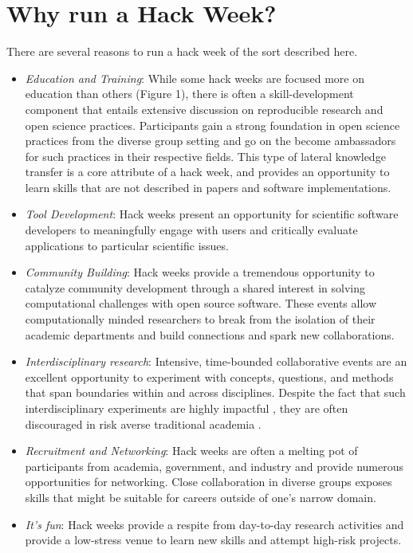 \section*{Why run a Hack Week?}

There are several reasons to run a hack week of the sort described here.

\begin{itemize}
\item{\textit{Education and Training}: 
While some hack weeks are focused more on education than others (Figure 1), there is often a skill-development component that entails extensive discussion on reproducible research and open science practices. Participants gain a strong foundation in open science practices from the diverse group setting and go on the become ambassadors for such practices in their respective fields. This type of lateral knowledge transfer is a core attribute of a hack week, and provides an opportunity to learn skills that are not described in papers and software implementations.}

\item{\textit{Tool Development}: Hack weeks present an opportunity for scientific software developers to meaningfully engage with users and critically evaluate applications to particular scientific issues.}

\item{\textit{Community Building}: Hack weeks provide a tremendous opportunity to catalyze community development through a shared interest in solving computational challenges with open source software. These events allow computationally minded researchers to break from the isolation of their academic departments and build connections and spark new collaborations.}


\item{\textit{Interdisciplinary research}: Intensive, time-bounded collaborative events are an excellent opportunity to experiment with concepts, questions, and methods that span boundaries within and across disciplines. Despite the fact that such interdisciplinary experiments are highly impactful \cite{Hall2012-hi}, they are often discouraged in risk averse traditional academia \cite{Sung2003-go, Rhoten2004-fk}}.

\item{\textit{Recruitment and Networking}: Hack weeks are often a melting pot of participants from academia, government, and industry and provide numerous opportunities for networking. Close collaboration in diverse groups exposes skills that might be suitable for careers outside of one's narrow domain.}

\item{\textit{It's fun}: Hack weeks provide a respite from day-to-day research activities and provide a low-stress venue to learn new skills and attempt high-risk projects.}

\end{itemize}


